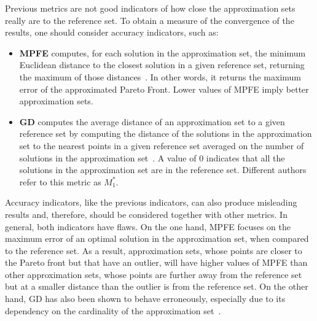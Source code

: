 	Previous metrics are not good indicators of how close the approximation sets really are to the reference set. To obtain a measure of the convergence of the results, one should consider accuracy indicators, such as:
	\begin{itemize}
		\item \textbf{\ac{MPFE}} computes, for each solution in the approximation set, the minimum Euclidean distance to the closest solution in a given reference set, returning the maximum of those distances~\cite{Veldhuizen1999GD}. In other words, it returns the maximum error of the approximated Pareto Front. Lower values of \ac{MPFE} imply better approximation sets. 
		\item \textbf{\ac{GD}} computes the average distance of an approximation set to a given reference set by computing the distance of the solutions in the approximation set to the nearest points in a given reference set averaged on the number of solutions in the approximation set~\cite{Veldhuizen1999GD}. A value of $0$ indicates that all the solutions in the approximation set are in the reference set. Different authors\cite{Zitzler2000m1m3} refer to this metric as \textbf{$M_1^\ast$}.
	\end{itemize}
	
	Accuracy indicators, like the previous indicators, can also produce misleading results and, therefore, should be considered together with other metrics. In general, both indicators have flaws. On the one hand, \ac{MPFE} focuses on the maximum error of an optimal solution in the approximation set, when compared to the reference set. As a result, approximation sets, whose points are closer to the Pareto front but that have an outlier, will have higher values of \ac{MPFE} than other approximation sets, whose points are further away from the reference set but at a smaller distance than the outlier is from the reference set. On the other hand, \ac{GD} has also been shown to behave erroneously, especially due to its dependency on the cardinality of the approximation set~\cite{Ishibuchi2005GDIGD}.
	
